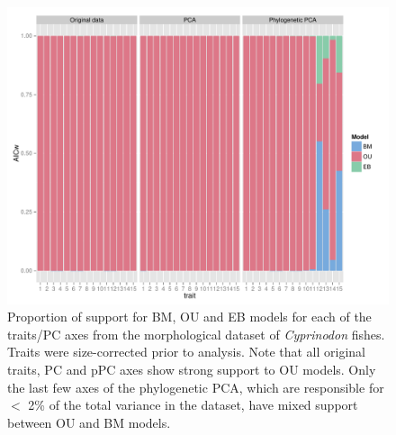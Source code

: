 \documentclass[a4paper,11pt]{article}
\begin{document}
\begin{figure}[p]
\centering
\includegraphics[scale=0.65]{fig/cypri_aicw.pdf}
\caption{Proportion of support for BM, OU and EB models for each of the traits/PC axes from the morphological dataset of \textit{Cyprinodon} fishes. Traits were size-corrected prior to analysis. Note that all original traits, PC and pPC axes show strong support to OU models. Only the last few axes of the phylogenetic PCA, which are responsible for $<$ 2\% of the total variance in the dataset, have mixed support between OU and BM models.}
\label{cypri.aicw}
\end{figure}
\end{document}
